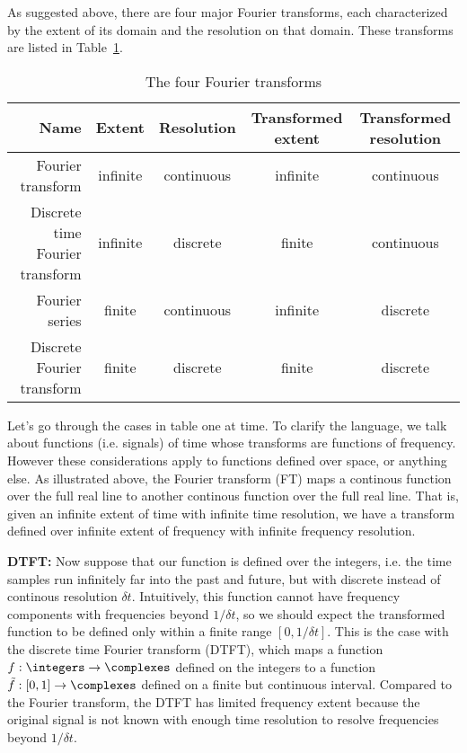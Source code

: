 As suggested above, there are four major Fourier transforms, each characterized by the extent of its domain and the resolution on that domain.
These transforms are listed in Table~\ref{tab:four_transforms}.
\begin{table}
  \begin{center}
    \caption{The four Fourier transforms}
    \label{tab:four_transforms}
    \begin{tabular}{|r|c|c|c|c|}
      \hline
      \textbf{Name}                   & \textbf{Extent}  & \textbf{Resolution}  & \textbf{Transformed extent}   & \textbf{Transformed resolution} \\
      \hline
      \hline
      Fourier transform               & infinite                & continuous                  & infinite                & continuous \\
      \hline
      Discrete time Fourier transform & infinite                & discrete                    & finite                  & continuous \\
      \hline
      Fourier series                  & finite                  & continuous                  & infinite                & discrete \\
      \hline
      Discrete Fourier transform      & finite                  & discrete                    & finite                  & discrete \\
      \hline
    \end{tabular}
  \end{center}
\end{table}
Let's go through the cases in table one at time.
To clarify the language, we talk about functions (i.e. signals) of time whose transforms are functions of frequency.
However these considerations apply to functions defined over space, or anything else.
As illustrated above, the Fourier transform (FT) maps a continous function over the full real line to another continous function over the full real line.
That is, given an infinite extent of time with infinite time resolution, we have a transform defined over infinite extent of frequency with infinite frequency resolution.

\textbf{DTFT:} Now suppose that our function is defined over the integers, i.e. the time samples run infinitely far into the past and future, but with discrete instead of continous resolution $\delta t$.
Intuitively, this function cannot have frequency components with frequencies beyond $1/\delta t$, so we should expect the transformed function to be defined only within a finite range $[0, 1/\delta t]$.
This is the case with the discrete time Fourier transform (DTFT), which maps a function $f: \integers \rightarrow \complexes$ defined on the integers to a function $\tilde f: [0, 1] \rightarrow \complexes$ defined on a finite but continuous interval.
Compared to the Fourier transform, the DTFT has limited frequency extent because the original signal is not known with enough time resolution to resolve frequencies beyond $1/\delta t$.

